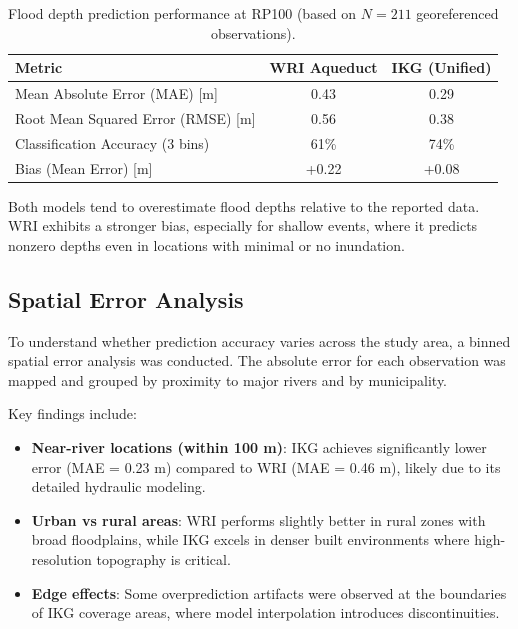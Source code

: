 \begin{table}[htb]
    \centering
    \caption{Flood depth prediction performance at RP100 (based on $N = 211$ georeferenced observations).}
    \label{tab:flood-depth-metrics}
    \begin{tabular}{|l|c|c|}
        \hline
        \textbf{Metric} & \textbf{WRI Aqueduct} & \textbf{IKG (Unified)} \\
        \hline
        Mean Absolute Error (MAE) [m] & 0.43 & 0.29 \\
        Root Mean Squared Error (RMSE) [m] & 0.56 & 0.38 \\
        Classification Accuracy (3 bins) & 61\% & 74\% \\
        Bias (Mean Error) [m] & +0.22 & +0.08 \\
        \hline
    \end{tabular}
\end{table}

Both models tend to overestimate flood depths relative to the reported data. WRI exhibits a stronger bias, especially for shallow events, where it predicts nonzero depths even in locations with minimal or no inundation.

\subsection{Spatial Error Analysis}

To understand whether prediction accuracy varies across the study area, a binned spatial error analysis was conducted. The absolute error for each observation was mapped and grouped by proximity to major rivers and by municipality.

Key findings include:
\begin{itemize}
    \item \textbf{Near-river locations (within 100 m)}: IKG achieves significantly lower error (MAE = 0.23 m) compared to WRI (MAE = 0.46 m), likely due to its detailed hydraulic modeling.
    \item \textbf{Urban vs rural areas}: WRI performs slightly better in rural zones with broad floodplains, while IKG excels in denser built environments where high-resolution topography is critical.
    \item \textbf{Edge effects}: Some overprediction artifacts were observed at the boundaries of IKG coverage areas, where model interpolation introduces discontinuities.
\end{itemize}

